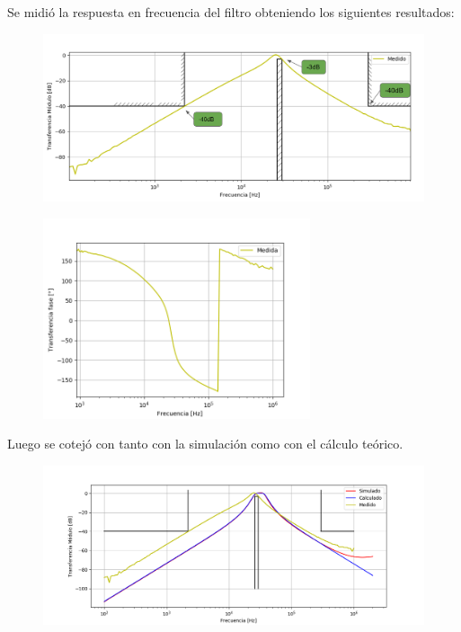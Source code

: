 Se midió la respuesta en frecuencia del filtro obteniendo los siguientes resultados:
\begin{figure}[H]
	\centering
	\includegraphics[width=\textwidth]{Imagenes-Ej2/BodeRauch.png}
	\label{fig:graph}
\end{figure}
\begin{figure}[H]
	\centering
	\includegraphics[width=0.7\textwidth]{Imagenes-Ej2/BodeRauchFase.png}
	\label{fig:graph}
\end{figure}
Luego se cotejó con tanto con la simulación como con el cálculo teórico.
\begin{figure}[H]
	\centering
	\includegraphics[width=\textwidth]{Imagenes-Ej2/BodeRauchCalcsim.png}
	\label{fig:Bodecalcsim}
\end{figure}
